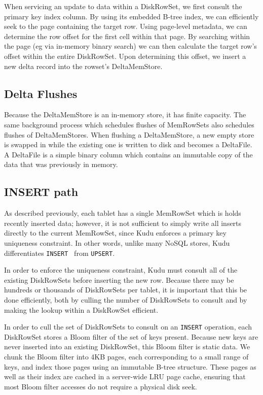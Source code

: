 \documentclass[twocolumn,9pt]{article}
\begin{document}
When servicing an update to data within a DiskRowSet, we first consult the primary key index column.
By using its embedded B-tree index, we can efficiently seek to the page containing the target
row. Using page-level metadata, we can determine the row offset for the first cell within that
page. By searching within the page (eg via in-memory binary search) we can then calculate the
target row's offset within the entire DiskRowSet. Upon determining this offset, we insert a new
delta record into the rowset's DeltaMemStore.

\subsection{Delta Flushes}

Because the DeltaMemStore is an in-memory store, it has finite capacity. The same background
process which schedules flushes of MemRowSets also schedules flushes of DeltaMemStores.
When flushing a DeltaMemStore, a new empty store is swapped in while the existing one
is written to disk and becomes a DeltaFile. A DeltaFile is a simple binary column
which contains an immutable copy of the data that was previously in memory.

\subsection{INSERT path}

As described previously, each tablet has a single MemRowSet which is holds
recently inserted data; however, it is not sufficient to simply write all inserts directly
to the current MemRowSet, since Kudu enforces a primary key uniqueness constraint. In other
words, unlike many NoSQL stores, Kudu differentiates {\tt INSERT } from {\tt UPSERT}.

In order to enforce the uniqueness constraint, Kudu must consult all of the existing DiskRowSets
before inserting the new row. Because there may be hundreds or thousands of DiskRowSets per
tablet, it is important that this be done efficiently, both by culling the number of DiskRowSets
to consult and by making the lookup within a DiskRowSet efficient.

In order to cull the set of DiskRowSets to consult on an {\tt INSERT} operation, each DiskRowSet
stores a Bloom filter of the set of keys present. Because new keys are
never inserted into an existing DiskRowSet, this Bloom filter is static data. We chunk the Bloom
filter into 4KB pages, each corresponding to a small range of keys, and index those pages using
an immutable B-tree structure. These pages as well as their index are cached in a server-wide
LRU page cache, ensuring that most Bloom filter accesses do not require a physical disk seek.
\end{document}
